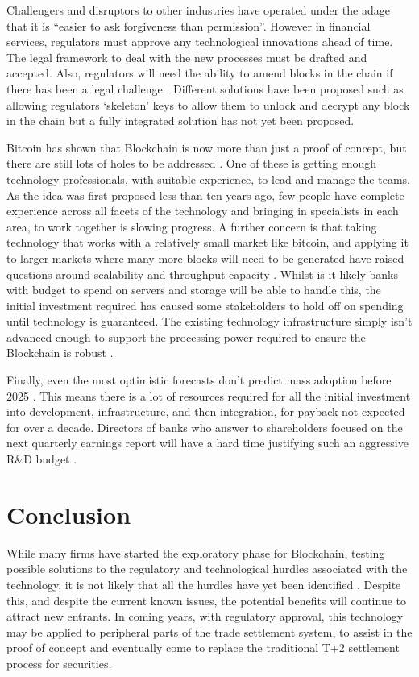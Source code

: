\documentclass[pdftex]{article}
\begin{document}
Challengers and disruptors to other industries have operated under the adage that it is ``easier to ask forgiveness than permission''. However in financial services, regulators must approve any technological innovations ahead of time. The legal framework to deal with the new processes must be drafted and accepted. Also, regulators will need the ability to amend blocks in the chain if there has been a legal challenge \cite{WymanEuro}. Different solutions have been proposed such as allowing regulators `skeleton' keys to allow them to unlock and decrypt any block in the chain but a fully integrated solution has not yet been proposed.

Bitcoin has shown that Blockchain is now more than just a proof of concept, but there are still lots of holes to be addressed \cite{Deloitte}. One of these is getting enough technology professionals, with suitable experience, to lead and manage the teams. As the idea was first proposed less than ten years ago, few people have complete experience across all facets of the technology and bringing in specialists in each area, to work together is slowing progress. A further concern is that taking technology that works with a relatively small market like bitcoin, and applying it to larger markets where many more blocks will need to be generated have raised questions around scalability and throughput capacity \cite{WymanEuro}. Whilst is it likely banks with budget to spend on servers and storage will be able to handle this, the initial investment required has caused some stakeholders to hold off on spending until technology is guaranteed. The existing technology infrastructure simply isn't advanced enough to support the processing power required to ensure the Blockchain is robust \cite{WymanEuro}.

Finally, even the most optimistic forecasts don't predict mass adoption before 2025 \cite{WymanEuro}. This means there is a lot of resources required for all the initial investment into development, infrastructure, and then integration, for payback not expected for over a decade. Directors of banks who answer to shareholders focused on the next quarterly earnings report will have a hard time justifying such an aggressive R\&D budget \cite{Accenture}.

\section{Conclusion}

While many firms have started the exploratory phase for Blockchain, testing possible solutions to the regulatory and technological hurdles associated with the technology, it is not likely that all the hurdles have yet been identified \cite{Accenture}. Despite this, and despite the current known issues, the potential benefits will continue to attract new entrants. In coming years, with regulatory approval, this technology may be applied to peripheral parts of the trade settlement system, to assist in the proof of concept and eventually come to replace the traditional T+2 settlement process for securities.
\end{document}
